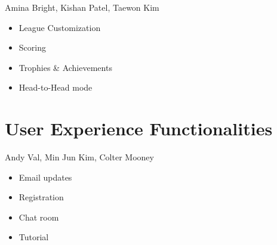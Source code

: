 \documentclass[11pt,letterpaper,oneside]{memoir}
\begin{document}
Amina Bright, Kishan Patel, Taewon Kim
\begin{itemize}
\item League Customization
\item Scoring
\item Trophies \& Achievements
\item Head-to-Head mode
\end{itemize}

\section{User Experience Functionalities}

Andy Val, Min Jun Kim, Colter Mooney
\begin{itemize}
\item Email updates
\item Registration
\item Chat room
\item Tutorial
\end{itemize}
\end{document}
